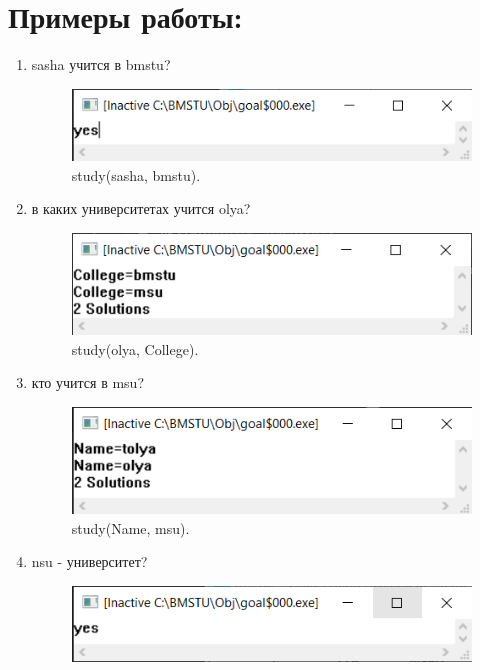\section{Примеры работы:}
\begin{enumerate}
    \item sasha учится в bmstu?
\begin{figure}[H]
    \centering
    \includegraphics[scale=1.5]{data/image/1.png}
    \caption{study(sasha, bmstu).}
\end{figure}

    \item в каких университетах учится olya?
\begin{figure}[H]
    \centering
    \includegraphics[scale=1.5]{data/image/2.png}
    \caption{study(olya, College).}
\end{figure}
    \item кто учится в msu?
\begin{figure}[H]
    \centering
    \includegraphics[scale=1.5]{data/image/3.png}
    \caption{study(Name, msu).}
\end{figure}
    \item nsu - университет?
\begin{figure}[H]
    \centering
    \includegraphics[scale=1.5]{data/image/4.png}

\end{figure}
\end{enumerate}
